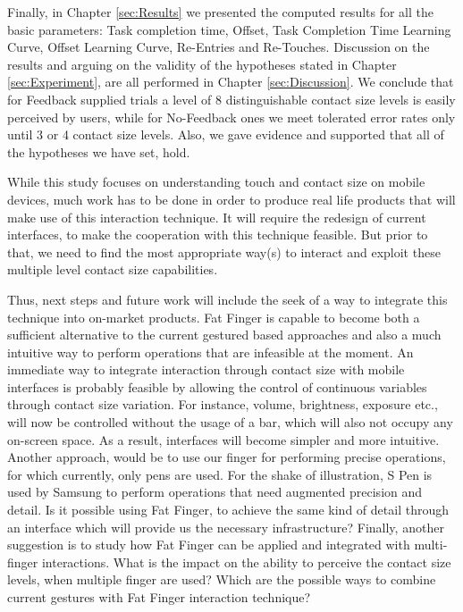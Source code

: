 Finally, in Chapter \ref{sec:Results} we presented the computed results for all the basic parameters: Task completion time, Offset, Task Completion Time Learning Curve, Offset Learning Curve, Re-Entries and Re-Touches. Discussion on the results and arguing on the validity of the hypotheses stated in Chapter \ref{sec:Experiment}, are all performed in Chapter \ref{sec:Discussion}. We conclude that for Feedback supplied trials a level of 8 distinguishable contact size levels is easily perceived by users, while for No-Feedback ones we meet tolerated error rates only until 3 or 4 contact size levels. Also, we gave evidence and supported that all of the hypotheses we have set, hold.

While this study focuses on understanding touch and contact size on mobile devices, much work has to be done in order to produce real life products that will make use of this interaction technique. It will require the redesign of current interfaces, to make the cooperation with this technique feasible. But prior to that, we need to find the most appropriate way(s) to interact and exploit these multiple level contact size capabilities.

Thus, next steps and future work will include the seek of a way to integrate this technique into on-market products. Fat Finger is capable to become both a sufficient alternative to the current gestured based approaches and also a much intuitive way to perform operations that are infeasible at the moment. 
An immediate way to integrate interaction through contact size with mobile interfaces is probably feasible by allowing the control of continuous variables through contact size variation. For instance, volume, brightness, exposure etc., will now be controlled without the usage of a bar, which will also not occupy any on-screen space. As a result, interfaces will become simpler and more intuitive.
Another approach, would be to use our finger for performing precise operations, for which currently, only pens are used. For the shake of illustration, S Pen is used by Samsung to perform operations that need augmented precision and detail. Is it possible using Fat Finger, to achieve the same kind of detail through an interface which will provide us the necessary infrastructure?
Finally, another suggestion is to study how Fat Finger can be applied and integrated with multi-finger interactions. What is the impact on the ability to perceive the contact size levels, when multiple finger are used? 
Which are the possible ways to combine current gestures with Fat Finger interaction technique?


